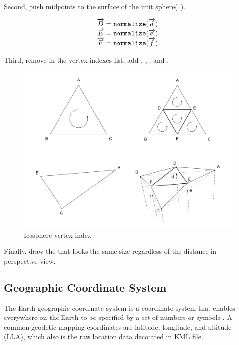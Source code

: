 Second, push midpoints to the surface of the unit sphere(1).

\[
\begin{array}{lr}
\overrightarrow{D} = \texttt{normalize}(\overrightarrow{d})\\
\overrightarrow{E} = \texttt{normalize}(\overrightarrow{e})\\
\overrightarrow{F} = \texttt{normalize}(\overrightarrow{f})\\
\end{array}
\]

Third, remove  in the vertex indexes list, add , , , and .

\begin{figure}[H]
	\caption{Icosphere vertex index}
	\label{fig:icosphere-vertex-index}
	\centering
	\includegraphics[width=\linewidth]{Figures/icosphere-vertex-index.png}
	\decoRule
\end{figure}

Finally, draw the  that looks the same size regardless of the distance in perspective view.

\subsection{Geographic Coordinate System}

The Earth geographic coordinate system is a coordinate system that enables everywhere on the Earth to be specified by a set of numbers or symbols \cite{wiki.geographic-coordinate-system.2016}. A common geodetic mapping coordinates are latitude, longitude, and altitude (LLA), which also is the raw location data decorated in KML file.

